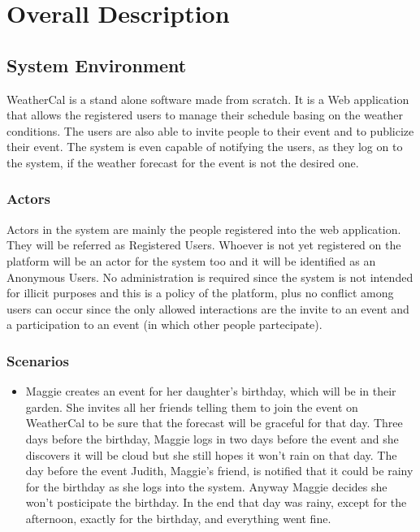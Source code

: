 \chapter{Overall Description} \label{cap:cap2}
\section{System Environment}
WeatherCal is a stand alone software made from scratch. It is a Web application that allows the registered users to manage their schedule basing on the weather conditions. The users are also able to invite people to their event and to publicize their event.  
The system is even capable of notifying the users, as they log on to the system, if the weather forecast for the event is not the desired one.
\subsection{Actors}
Actors in the system are mainly the people registered into the web application. They will be referred as Registered Users.
Whoever is not yet registered on the platform will be an actor for the system too and it will be identified as an Anonymous  Users.
No administration is required since the system is not intended for illicit purposes and this is a policy of the platform, plus no conflict among users can occur since the only allowed interactions are the invite to an event and a participation to an event (in which other people partecipate).
\subsection{Scenarios}
\begin{itemize}
\item Maggie creates an event for her daughter's birthday, which will be in their garden. She invites all her friends telling them to join the event on WeatherCal to be sure that the forecast will be graceful for that day. Three days before the birthday, Maggie logs in two days before the event and she discovers it will be cloud but she still hopes it won't rain on that day. The day before the event Judith, Maggie's friend, is notified that it could be rainy for the birthday as she logs into the system. Anyway Maggie decides she won't posticipate the birthday. In the end that day was rainy, except for the afternoon, exactly for the birthday, and everything went fine.
\end{itemize}

